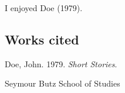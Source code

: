 
%
\newlength{\cslhangindent}
\setlength{\cslhangindent}{1.5em}
\newlength{\csllabelwidth}
\setlength{\csllabelwidth}{3em}
\newenvironment{CSLReferences}[2] %
 {%
  \setlength{\parindent}{0pt}
  \ifodd #1 \everypar{\setlength{\hangindent}{\cslhangindent}}\ignorespaces\fi
  \ifnum #2 > 0
  \setlength{\parskip}{#2\baselineskip}
  \fi
 }%
 {}
\usepackage{calc}
\newcommand{\CSLBlock}[1]{#1\hfill\break}
\newcommand{\CSLLeftMargin}[1]{\parbox[t]{\csllabelwidth}{#1}}
\newcommand{\CSLRightInline}[1]{\parbox[t]{\linewidth - \csllabelwidth}{#1}\break}
\newcommand{\CSLIndent}[1]{\hspace{\cslhangindent}#1}



I enjoyed Doe (1979).

\hypertarget{works-cited}{%
\subsection*{Works cited}\label{works-cited}}

\hypertarget{refs}{}
\begin{CSLReferences}{1}{0}
\leavevmode{}%
Doe, John. 1979. \emph{Short Stories}.

\end{CSLReferences}

Seymour Butz
School of Studies





%





